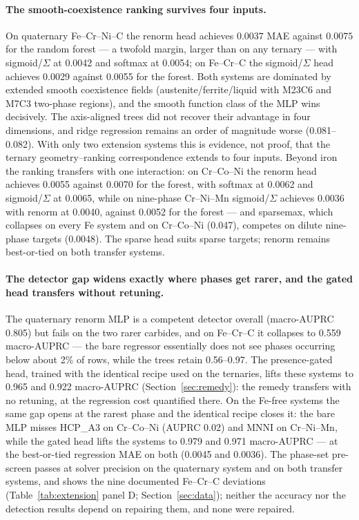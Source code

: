 \documentclass[preprint,12pt,authoryear]{elsarticle}
\begin{document}
\paragraph{The smooth-coexistence ranking survives four inputs.}
On quaternary Fe--Cr--Ni--C the renorm head achieves $0.0037$ MAE
against $0.0075$ for the random forest --- a twofold margin, larger
than on any ternary --- with sigmoid/$\Sigma$ at 0.0042 and softmax at
0.0054; on Fe--Cr--C the sigmoid/$\Sigma$ head achieves 0.0029 against
0.0055 for the forest. Both systems are dominated by extended smooth
coexistence fields (austenite/ferrite/liquid with M23C6 and M7C3
two-phase regions), and the smooth function class of the MLP wins
decisively. The axis-aligned trees did not recover their advantage in
four dimensions, and ridge regression remains an order of magnitude
worse (0.081--0.082). With only two extension systems this is evidence,
not proof, that the ternary geometry--ranking correspondence extends to
four inputs. Beyond iron the ranking transfers with one interaction: on
Cr--Co--Ni the renorm head achieves 0.0055 against 0.0070 for the forest,
with softmax at 0.0062 and sigmoid/$\Sigma$ at 0.0065, while on nine-phase
Cr--Ni--Mn sigmoid/$\Sigma$ achieves 0.0036 with renorm at 0.0040, against
0.0052 for the forest --- and sparsemax, which collapses on every Fe
system and on Cr--Co--Ni (0.047), competes on dilute nine-phase targets
(0.0048). The sparse head suits sparse targets; renorm remains best-or-tied
on both transfer systems.

\paragraph{The detector gap widens exactly where phases get rarer, and
the gated head transfers without retuning.}
The quaternary renorm MLP is a competent detector overall (macro-AUPRC
0.805) but fails on the two rarer carbides, and on Fe--Cr--C it collapses
to 0.559 macro-AUPRC --- the bare regressor essentially does not see
phases occurring below about 2\% of rows, while the trees retain
0.56--0.97.
The presence-gated head, trained with the identical recipe used on the
ternaries, lifts these systems to 0.965 and 0.922 macro-AUPRC
(Section~\ref{sec:remedy}): the remedy transfers with no retuning, at the
regression cost quantified there. On the Fe-free systems the same gap
opens at the rarest phase and the identical recipe closes it: the bare
MLP misses HCP\_A3 on Cr--Co--Ni (AUPRC 0.02) and MNNI on Cr--Ni--Mn,
while the gated head lifts the systems to 0.979 and 0.971 macro-AUPRC ---
at the best-or-tied regression MAE on both (0.0045 and 0.0036).
The phase-set pre-screen passes at
solver precision on the quaternary system and on both transfer systems,
and shows the nine documented
Fe--Cr--C deviations (Table~\ref{tab:extension} panel D;
Section~\ref{sec:data}); neither the accuracy nor
the detection results depend on repairing them, and none were repaired.
\end{document}
